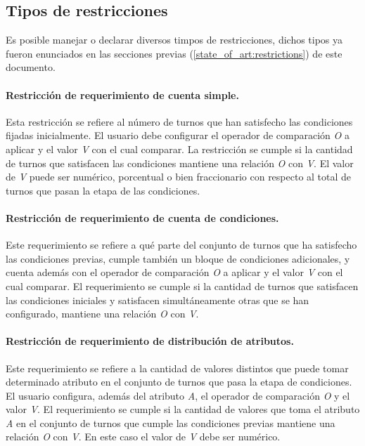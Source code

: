 \subsection{Tipos de restricciones}

Es posible manejar o declarar diversos timpos de restricciones, dichos tipos ya fueron enunciados en las secciones previas (\ref{state_of_art:restrictions}) de este documento.

\paragraph{Restricción de requerimiento de cuenta simple.}  Esta restricción se refiere al número de turnos que han satisfecho las 
 condiciones fijadas inicialmente. El usuario debe configurar el operador de comparación \textit{O} a aplicar y el valor \textit{V} con el cual comparar. La restricción se cumple si la cantidad de turnos que satisfacen las condiciones mantiene una relación \textit{O} con \textit{V}. El valor de \textit{V} puede ser numérico, porcentual o bien fraccionario  con respecto al total de turnos que pasan la etapa de las condiciones.

\paragraph{Restricción de requerimiento de cuenta de condiciones.} Este requerimiento se refiere a qué parte del conjunto de turnos que ha 
 satisfecho las condiciones previas, cumple también un bloque de condiciones adicionales, y cuenta además con el operador de comparación \textit{O} a aplicar y el valor \textit{V} con el cual comparar. El requerimiento se cumple si la cantidad de turnos que satisfacen las condiciones iniciales y satisfacen simultáneamente otras que se han configurado, mantiene una relación \textit{O} con \textit{V}.

\paragraph{Restricción de requerimiento de distribución de atributos.} Este requerimiento se refiere a la cantidad de valores distintos que puede tomar determinado atributo en el conjunto de turnos que pasa la etapa de condiciones. El usuario configura, además del atributo \textit{A}, el operador de comparación \textit{O} y el valor \textit{V}. El requerimiento se cumple si la cantidad de valores que toma el atributo \textit{A} en el conjunto de turnos que cumple las condiciones previas mantiene una relación \textit{O} con  \textit{V}. En este caso el valor de \textit{V} debe ser numérico.

